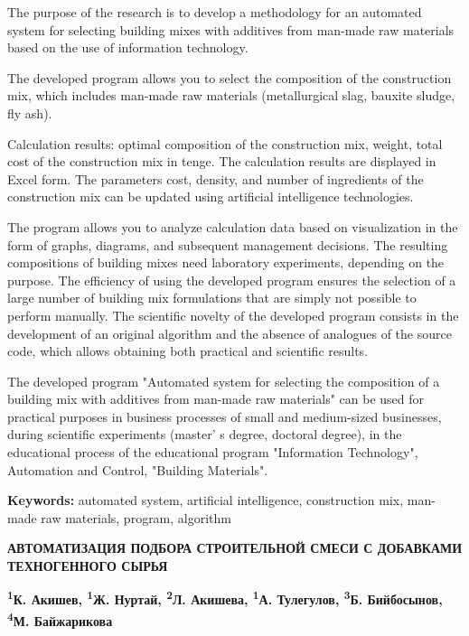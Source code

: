 The purpose of the research is to develop a methodology for an automated
system for selecting building mixes with additives from man-made raw
materials based on the use of information technology.

The developed program allows you to select the composition of the
construction mix, which includes man-made raw materials (metallurgical
slag, bauxite sludge, fly ash).

Calculation results: optimal composition of the construction mix,
weight, total cost of the construction mix in tenge. The calculation
results are displayed in Excel form. The parameters cost, density, and
number of ingredients of the construction mix can be updated using
artificial intelligence technologies.

The program allows you to analyze calculation data based on
visualization in the form of graphs, diagrams, and subsequent management
decisions. The resulting compositions of building mixes need laboratory
experiments, depending on the purpose. The efficiency of using the
developed program ensures the selection of a large number of building
mix formulations that are simply not possible to perform manually. The
scientific novelty of the developed program consists in the development
of an original algorithm and the absence of analogues of the source
code, which allows obtaining both practical and scientific results.

The developed program "Automated system for selecting the composition of
a building mix with additives from man-made raw materials" can be used
for practical purposes in business processes of small and medium-sized
businesses, during scientific experiments (master' s
degree, doctoral degree), in the educational process of the educational
program "Information Technology", Automation and Control, "Building
Materials".

{\bfseries Keywords:} automated system, artificial intelligence,
construction mix, man-made raw materials, program, algorithm

\begin{articleheader}
{\bfseries АВТОМАТИЗАЦИЯ ПОДБОРА СТРОИТЕЛЬНОЙ СМЕСИ С ДОБАВКАМИ ТЕХНОГЕННОГО СЫРЬЯ}

{\bfseries
\textsuperscript{1}К. Акишев\textsuperscript{\envelope },
\textsuperscript{1}Ж. Нуртай,
\textsuperscript{2}Л. Акишева,
\textsuperscript{1}А. Тулегулов,
\textsuperscript{3}Б. Бийбосынов,
\textsuperscript{4}М. Байжарикова}
\end{articleheader}

